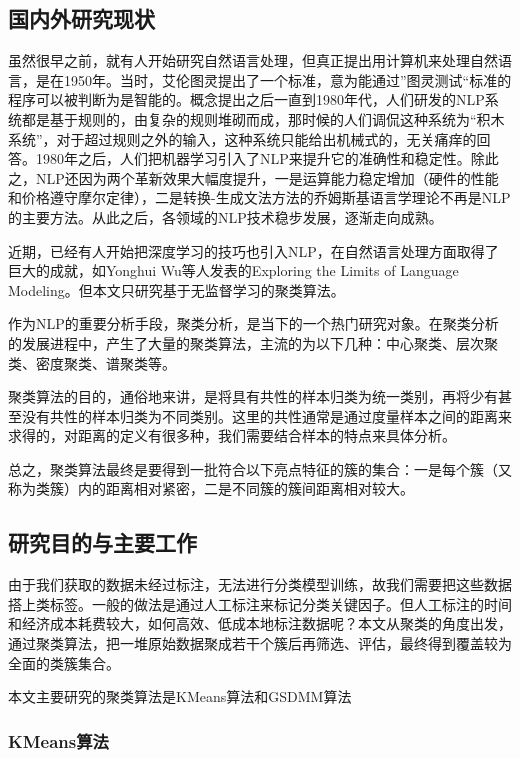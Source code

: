 \subsection{国内外研究现状}
虽然很早之前，就有人开始研究自然语言处理，但真正提出用计算机来处理自然语言，是在1950年。当时，艾伦图灵提出了一个标准，意为能通过”图灵测试“\cite{WEB:turing_test}标准的程序可以被判断为是智能的。概念提出之后一直到1980年代，人们研发的NLP系统都是基于规则的，由复杂的规则堆砌而成，那时候的人们调侃这种系统为“积木系统”，对于超过规则之外的输入，这种系统只能给出机械式的，无关痛痒的回答。1980年之后，人们把机器学习引入了NLP来提升它的准确性和稳定性。除此之，NLP还因为两个革新效果大幅度提升，一是运算能力稳定增加（硬件的性能和价格遵守摩尔定律），二是转换-生成文法方法的乔姆斯基语言学理论不再是NLP的主要方法\cite{WEB:turing_test}。从此之后，各领域的NLP技术稳步发展，逐渐走向成熟。

近期，已经有人开始把深度学习的技巧也引入NLP，在自然语言处理方面取得了巨大的成就，如Yonghui Wu等人发表的Exploring the Limits of Language Modeling\cite{DBLP:journals/corr/JozefowiczVSSW16}。但本文只研究基于无监督学习的聚类算法。

作为NLP的重要分析手段，聚类分析，是当下的一个热门研究对象。在聚类分析的发展进程中，产生了大量的聚类算法，主流的为以下几种：中心聚类、层次聚类、密度聚类、谱聚类等。

聚类算法的目的，通俗地来讲，是将具有共性的样本归类为统一类别，再将少有甚至没有共性的样本归类为不同类别。这里的共性通常是通过度量样本之间的距离来求得的，对距离的定义有很多种，我们需要结合样本的特点来具体分析。\cite{ZW:cluster_alg_study_compare}

总之，聚类算法最终是要得到一批符合以下亮点特征的簇的集合：一是每个簇（又称为类簇）内的距离相对紧密，二是不同簇的簇间距离相对较大。

\subsection{研究目的与主要工作}
由于我们获取的数据未经过标注，无法进行分类模型训练，故我们需要把这些数据搭上类标签。一般的做法是通过人工标注来标记分类关键因子。但人工标注的时间和经济成本耗费较大，如何高效、低成本地标注数据呢？本文从聚类的角度出发，通过聚类算法，把一堆原始数据聚成若干个簇后再筛选、评估，最终得到覆盖较为全面的类簇集合。

本文主要研究的聚类算法是KMeans\cite{Macqueen67somemethods}算法和GSDMM\cite{Yin:2014:DMM:2623330.2623715}算法

\subsubsection{KMeans算法}

